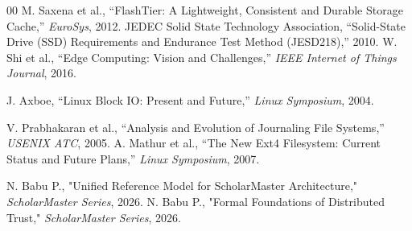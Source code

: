 \documentclass[conference]{IEEEtran}
\begin{document}
\begin{thebibliography}{00}
 M. Saxena et al., ``FlashTier: A Lightweight, Consistent and Durable Storage Cache,'' \textit{EuroSys}, 2012.
 JEDEC Solid State Technology Association, ``Solid-State Drive (SSD) Requirements and Endurance Test Method (JESD218),'' 2010.
 W. Shi et al., ``Edge Computing: Vision and Challenges,'' \textit{IEEE Internet of Things Journal}, 2016.

 J. Axboe, ``Linux Block IO: Present and Future,'' \textit{Linux Symposium}, 2004.

 V. Prabhakaran et al., ``Analysis and Evolution of Journaling File Systems,'' \textit{USENIX ATC}, 2005.
 A. Mathur et al., ``The New Ext4 Filesystem: Current Status and Future Plans,'' \textit{Linux Symposium}, 2007.


 N. Babu P., "Unified Reference Model for ScholarMaster Architecture," \textit{ScholarMaster Series}, 2026.
 N. Babu P., "Formal Foundations of Distributed Trust," \textit{ScholarMaster Series}, 2026.
\end{thebibliography}
\end{document}
